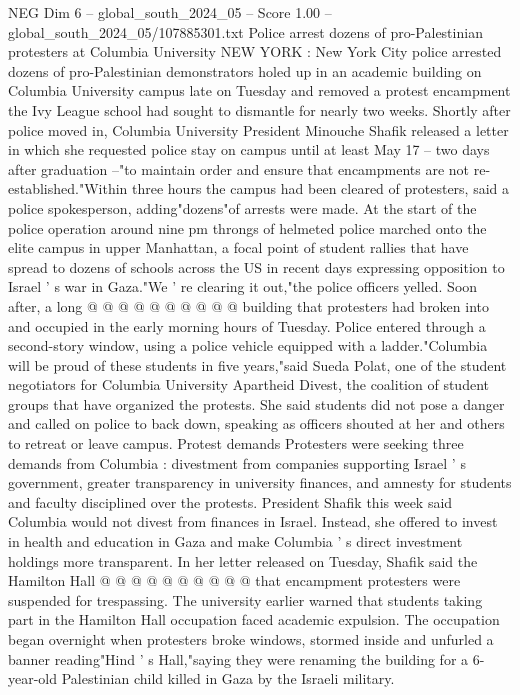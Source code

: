 \begin{textsample}{NEG Dim 6 – global\_south\_2024\_05 – Score 1.00 – global\_south\_2024\_05/107885301.txt}  \label{ex:f6_neg_245}
Police arrest dozens of pro-Palestinian protesters at Columbia University NEW YORK : New York City police arrested dozens of pro-Palestinian demonstrators holed up in an academic building on Columbia University campus late on Tuesday and removed a protest encampment the Ivy League school had sought to dismantle for nearly two weeks.
Shortly after police moved in, Columbia University President Minouche Shafik released a letter in which she requested police stay on campus until at least May 17 -- two days after graduation --"to maintain order and ensure that encampments are not re-established."Within three hours the campus had been cleared of protesters, said a police spokesperson, adding"dozens"of arrests were made.
At the start of the police operation around nine pm throngs of helmeted police marched onto the elite campus in upper Manhattan, a focal point of student rallies that have spread to dozens of schools across the US in recent days expressing opposition to Israel ' s war in Gaza."We ' re clearing it out,"the police officers yelled.
Soon after, a long @ @ @ @ @ @ @ @ @ @ building that protesters had broken into and occupied in the early morning hours of Tuesday.
Police entered through a second-story window, using a police vehicle equipped with a ladder."Columbia will be proud of these students in five years,"said Sueda Polat, one of the student negotiators for Columbia University Apartheid Divest, the coalition of student groups that have organized the protests.
She said students did not pose a danger and called on police to back down, speaking as officers shouted at her and others to retreat or leave campus.
Protest demands Protesters were seeking three demands from Columbia : divestment from companies supporting Israel ' s government, greater transparency in university finances, and amnesty for students and faculty disciplined over the protests.
President Shafik this week said Columbia would not divest from finances in Israel.
Instead, she offered to invest in health and education in Gaza and make Columbia ' s direct investment holdings more transparent.
In her letter released on Tuesday, Shafik said the Hamilton Hall @ @ @ @ @ @ @ @ @ @ that encampment protesters were suspended for trespassing.
The university earlier warned that students taking part in the Hamilton Hall occupation faced academic expulsion.
The occupation began overnight when protesters broke windows, stormed inside and unfurled a banner reading"Hind ' s Hall,"saying they were renaming the building for a 6-year-old Palestinian child killed in Gaza by the Israeli military.

\end{textsample}
